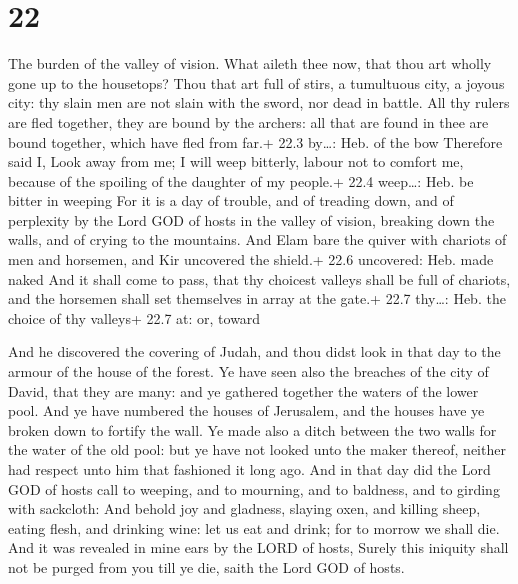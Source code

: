 \hypertarget{section-21}{%
\section{22}\label{section-21}}

 The burden of the valley of vision. What aileth thee now,
that thou art wholly gone up to the housetops?  Thou that
art full of stirs, a tumultuous city, a joyous city: thy slain men are
not slain with the sword, nor dead in battle.  All thy
rulers are fled together, they are bound by the archers: all that are
found in thee are bound together, which have fled from far.+ 22.3
by\ldots: Heb. of the bow  Therefore said I, Look away from
me; I will weep bitterly, labour not to comfort me, because of the
spoiling of the daughter of my people.+ 22.4 weep\ldots: Heb. be bitter
in weeping  For it is a day of trouble, and of treading
down, and of perplexity by the Lord GOD of hosts in the valley of
vision, breaking down the walls, and of crying to the mountains.
 And Elam bare the quiver with chariots of men and horsemen,
and Kir uncovered the shield.+ 22.6 uncovered: Heb. made naked
 And it shall come to pass, that thy choicest valleys shall
be full of chariots, and the horsemen shall set themselves in array at
the gate.+ 22.7 thy\ldots: Heb. the choice of thy valleys+ 22.7 at: or,
toward

 And he discovered the covering of Judah, and thou didst
look in that day to the armour of the house of the forest. 
Ye have seen also the breaches of the city of David, that they are many:
and ye gathered together the waters of the lower pool.  And
ye have numbered the houses of Jerusalem, and the houses have ye broken
down to fortify the wall.  Ye made also a ditch between the
two walls for the water of the old pool: but ye have not looked unto the
maker thereof, neither had respect unto him that fashioned it long ago.
 And in that day did the Lord GOD of hosts call to weeping,
and to mourning, and to baldness, and to girding with sackcloth:
 And behold joy and gladness, slaying oxen, and killing
sheep, eating flesh, and drinking wine: let us eat and drink; for to
morrow we shall die.  And it was revealed in mine ears by
the LORD of hosts, Surely this iniquity shall not be purged from you
till ye die, saith the Lord GOD of hosts.

